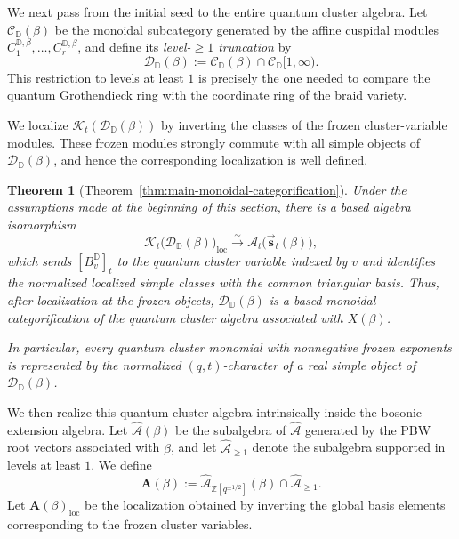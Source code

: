 \documentclass[12pt, reqno]{amsart}
\theoremstyle{plain}
\newtheorem{theorem}{Theorem}[section]
\theoremstyle{definition}
\numberwithin{equation}{section}
\newcommand{\ZZ}{\mathbb{Z}}
\newcommand{\DD}{\mathbb{D}}
\newcommand{\cA}{\mathcal{A}}
\begin{document}
We next pass from the initial seed to the entire quantum cluster
algebra. Let \(\mathscr C_{\DD}(\beta)\) be the monoidal subcategory
generated by the affine cuspidal modules
\(C_1^{\DD,\beta},\ldots,C_r^{\DD,\beta}\), and define its
\emph{level-\(\geq1\) truncation} by
\[
    \mathscr D_{\DD}(\beta)
    :=
    \mathscr C_{\DD}(\beta)
    \cap
    \mathscr C_{\DD}[1,\infty).
\]
This restriction to levels at least \(1\) is precisely the one needed
to compare the quantum Grothendieck ring with the coordinate ring of
the braid variety.

We localize \(\mathcal K_t(\mathscr D_{\DD}(\beta))\) by inverting
the classes of the frozen cluster-variable modules. These frozen
modules strongly commute with all simple objects of
\(\mathscr D_{\DD}(\beta)\), and hence the corresponding
localization is well defined.

\begin{theorem}[Theorem~\ref{thm:main-monoidal-categorification}]
\label{thm:monoidal-categorification}
Under the assumptions made at the beginning of this section, there is
a based algebra isomorphism
\begin{equation}\label{eq:intro-monoidal-categorification}
    \mathcal K_t\bigl(\mathscr D_{\DD}(\beta)\bigr)_{\mathrm{loc}}
    \xrightarrow{\sim}
    \mathcal A_t\bigl(
        \overrightarrow{\mathbf s}_t(\beta)
    \bigr),
\end{equation}
which sends \([B_v^{\DD}]_t\) to the quantum cluster variable indexed
by \(v\) and identifies the normalized localized simple classes with
the common triangular basis. Thus, after localization at the frozen
objects, \(\mathscr D_{\DD}(\beta)\) is a based monoidal
categorification of the quantum cluster algebra associated with
\(X(\beta)\).

In particular, every quantum cluster monomial with nonnegative frozen
exponents is represented by the normalized \((q,t)\)-character of a
real simple object of \(\mathscr D_{\DD}(\beta)\).
\end{theorem}

We then realize this quantum cluster algebra intrinsically inside
the bosonic extension algebra. Let \(\widehat{\cA}(\beta)\) be the
subalgebra of \(\widehat{\cA}\) generated by the PBW root vectors
associated with \(\beta\), and let \(\widehat{\cA}_{\geq1}\) denote
the subalgebra supported in levels at least \(1\). We define
\[
    \mathbf A(\beta)
    :=
    \widehat{\cA}_{\ZZ[q^{\pm1/2}]}(\beta)
    \cap
    \widehat{\cA}_{\geq1}.
\]
Let \(\mathbf A(\beta)_{\mathrm{loc}}\) be the localization obtained
by inverting the global basis elements corresponding to the frozen
cluster variables.
\end{document}
